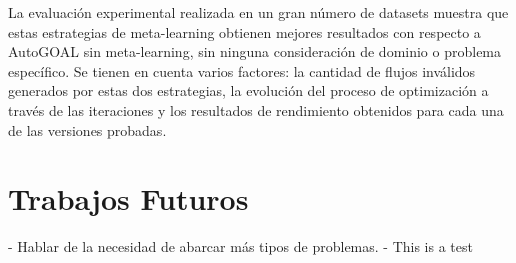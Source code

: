 \begin{conclusions}
La evaluación experimental realizada en un gran número de datasets muestra que estas estrategias de meta-learning obtienen mejores resultados con respecto a AutoGOAL sin meta-learning, sin ninguna consideración de dominio o problema específico. Se tienen en cuenta varios factores: la cantidad de flujos inválidos generados por estas dos estrategias, la evolución del proceso de optimización a través de las iteraciones y los resultados de rendimiento obtenidos para cada una de las versiones probadas.

\section{Trabajos Futuros}

- Hablar de la necesidad de abarcar más tipos de problemas. 
- This is a test

\end{conclusions}

